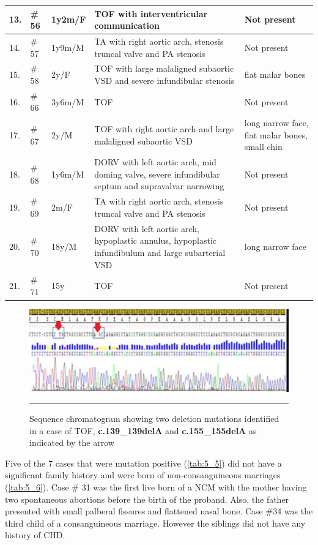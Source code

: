 \begin{refsection}
\begin{landscape}
\begin{spacing}{1}
\begin{longtable}{p{0.5in} p{0.5in} p{1in} p{3in} p{3in}}
	13.  & \# 56 & 1y2m/F & TOF with interventricular communication & Not present \\ \midrule
	14.  & \# 57 & 1y9m/M & TA with right aortic arch, stenosis truncal valve and PA stenosis & Not present \\ \midrule
	15.  & \# 58 & 2y/F & TOF with large malaligned subaortic VSD and severe infundibular stenosis & flat malar bones \\ \midrule
	16.  & \# 66 & 3y6m/M & TOF & Not present \\ \midrule
	17.  & \# 67 & 2y/M & TOF with right aortic arch and large malaligned subaortic VSD   & long narrow face, flat malar bones, small chin \\ \midrule
	18.  & \# 68 & 1y6m/M & DORV with left aortic arch, mid doming valve, severe infundibular septum and supravalvar narrowing & Not present \\ \midrule
	19.  & \# 69 & 2m/F & TA with right aortic arch, stenosis truncal valve and PA stenosis & Not present \\ \midrule
	20.  & \# 70 & 18y/M & DORV with left aortic arch, hypoplastic annulus, hypoplastic infundibulum and large subarterial VSD  & long narrow face \\ \midrule
	21.  & \# 71 & 15y & TOF & Not present \\ \bottomrule
\end{longtable}
\end{spacing}
\end{landscape}

\begin{figure}[!htb]
\centering
\includegraphics[scale=0.75,keepaspectratio]{Figures/Figure5_4.pdf}
\rule{35em}{0.5pt}
\caption[Sequence chromatogram showing two deletion mutations]{Sequence chromatogram showing two deletion mutations identified in a case of TOF, \textbf{c.139\_139delA} and \textbf{c.155\_155delA} as indicated by the arrow}
\label{fig:5_4}
\end{figure}

Five of the 7 cases that were mutation positive (\cref{tab:5_5}) did not have a significant family history and were born of non-consanguineous marriages (\cref{tab:5_6}). Case \# 31 was the first live born of a NCM with the mother having two spontaneous abortions before the birth of the proband. Also, the father presented with small palberal fissures and flattened nasal bone. Case \#34 was the third child of a consanguineous marriage. However the siblings did not have any history of CHD.



\end{refsection}
